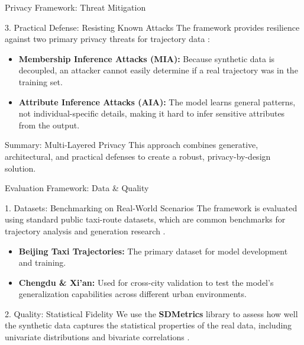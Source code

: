 \documentclass[aspectratio=169,xcolor={dvipsnames}]{beamer}
\begin{document}
\begin{frame}{Privacy Framework: Threat Mitigation}
    \begin{alertblock}{3. Practical Defense: Resisting Known Attacks}
        \small
        The framework provides resilience against two primary privacy threats for trajectory data \cite{buchholzSystematisationKnowledgeTrajectory2024}:
        \begin{itemize}
            \item \textbf{Membership Inference Attacks (MIA):} Because synthetic data is decoupled, an attacker cannot easily determine if a real trajectory was in the training set.
            \item \textbf{Attribute Inference Attacks (AIA):} The model learns general patterns, not individual-specific details, making it hard to infer sensitive attributes from the output.
        \end{itemize}
    \end{alertblock}

    \vspace{1em}
    \begin{block}{Summary: Multi-Layered Privacy}
      \centering
      \large
      This approach combines generative, architectural, and practical defenses to create a robust, privacy-by-design solution.
    \end{block}
\end{frame}

\begin{frame}{Evaluation Framework: Data \& Quality}
    \begin{block}{1. Datasets: Benchmarking on Real-World Scenarios}
        \small
        The framework is evaluated using standard public taxi-route datasets, which are common benchmarks for trajectory analysis and generation research \cite{zhuDiffTrajGeneratingGPS2023}.
        \begin{itemize}
            \item \textbf{Beijing Taxi Trajectories:} The primary dataset for model development and training.
            \item \textbf{Chengdu \& Xi'an:} Used for cross-city validation to test the model's generalization capabilities across different urban environments.
        \end{itemize}
    \end{block}
    
    \vspace{1em}
    
    \begin{block}{2. Quality: Statistical Fidelity}
        \small
        We use the \textbf{SDMetrics} library to assess how well the synthetic data captures the statistical properties of the real data, including univariate distributions and bivariate correlations \cite{espinosaQualitySyntheticGenerated2023}.
    \end{block}
\end{frame}
\end{document}
